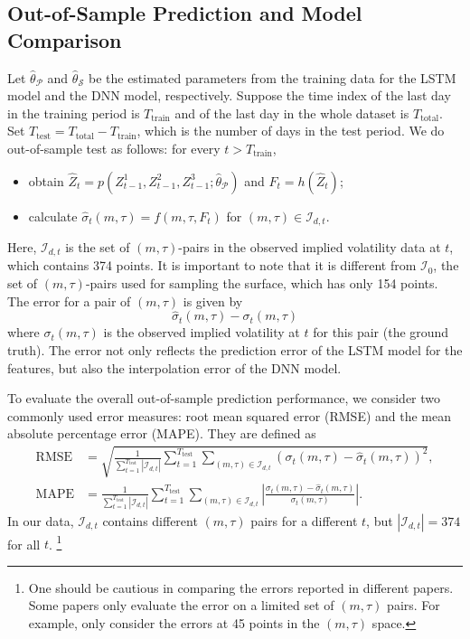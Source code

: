 \documentclass[11pt,a4paper]{article}
\theoremstyle{remark}
\begin{document}
\subsection{Out-of-Sample Prediction and Model Comparison}
Let $\hat{\theta}_{\mathcal{P}}$ and $\hat{\theta}_{\mathcal{S}}$ be the estimated parameters from the training data for the LSTM model and the DNN model, respectively.  Suppose the time index of the last day in the training period is $T_{\text{train}}$ and of the last day in the whole dataset is $T_{\text{total}}$. Set $T_{\text{test}}=T_{\text{total}}-T_{\text{train}}$, which is the number of days in the test period. We do out-of-sample test as follows: for every $t>T_{\text{train}}$, 
\begin{itemize}
	\item obtain $\hat{Z}_{t}=p(Z^1_{t-1},Z^2_{t-1},Z^3_{t-1};\hat{\theta}_\mathcal{P})$ and $F_t=h(\hat{Z}_t)$;
	\item calculate $\hat{\sigma}_{t}(m,\tau)=f(m,\tau,F_{t})$ for $(m,\tau)\in\mathcal{I}_{d,t}$. 
\end{itemize}
Here, $\mathcal{I}_{d,t}$ is the set of $(m,\tau)$-pairs in the observed implied volatility data at $t$, which contains 374 points. It is important to note that it is different from $\mathcal{I}_0$, the set of $(m,\tau)$-pairs used for sampling the surface, which has only 154 points. The error for a pair of $(m,\tau)$ is given by
\begin{equation}
	\hat{\sigma}_{t}(m,\tau)-\sigma_{t}(m,\tau)
\end{equation}
where $\sigma_{t}(m,\tau)$ is the observed implied volatility at $t$ for this pair (the ground truth). The error not only reflects the prediction error of the LSTM model for the features, but also the interpolation error of the DNN model.
	

To evaluate the overall out-of-sample prediction performance, we consider two commonly used error measures: root mean squared error (RMSE) and the mean absolute percentage error (MAPE). They are defined as
\begin{align}
\text{RMSE}&=\sqrt{\frac{1}{\sum_{t=1}^{T_{\text{test}}}|\mathcal{I}_{d,t}|} \sum_{t=1}^{T_{\text{test}}} \sum_{(m,\tau)\in\mathcal{I}_{d,t}}\left(\sigma_{t}(m,\tau)-\hat{\sigma}_{t}(m,\tau)\right)^{2}},\\
\text{MAPE}&=\frac{1}{\sum_{t=1}^{T_{\text{test}}}|\mathcal{I}_{d,t}|} \sum_{t=1}^{T_{\text{test}}} \sum_{(m,\tau)\in\mathcal{I}_{d,t}}\left|\frac{\sigma_{t}(m,\tau)-\hat{\sigma}_{t}(m,\tau)}{\sigma_{t}(m,\tau)}\right|.
\end{align}
In our data, $\mathcal{I}_{d,t}$ contains different $(m,\tau)$ pairs for a different $t$, but $|\mathcal{I}_{d,t}|=374$ for all $t$. \footnote{One should be cautious in comparing the errors reported in different papers. Some papers only evaluate the error on a limited set of $(m,\tau)$ pairs. For example, \cite{chen2019forecasting} only consider the errors at 45 points in the $(m,\tau)$ space.}
\end{document}
